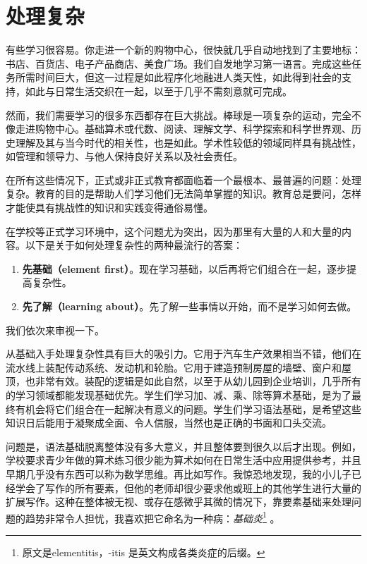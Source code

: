 \section*{处理复杂}

有些学习很容易。你走进一个新的购物中心，很快就几乎自动地找到了主要地标：书店、百货店、电子产品商店、美食广场。我们自发地学习第一语言。完成这些任务所需时间巨大，但这一过程是如此程序化地融进人类天性，如此得到社会的支持，如此与日常生活交织在一起，以至于几乎不需刻意就可完成。

然而，我们需要学习的很多东西都存在巨大挑战。棒球是一项复杂的运动，完全不像走进购物中心。基础算术或代数、阅读、理解文学、科学探索和科学世界观、历史理解及其与当今时代的相关性，也是如此。学术性较低的领域同样具有挑战性，如管理和领导力、与他人保持良好关系以及社会责任。

在所有这些情况下，正式或非正式教育都面临着一个最根本、最普遍的问题：处理复杂。教育的目的是帮助人们学习他们无法简单掌握的知识。教育总是要问，怎样才能使具有挑战性的知识和实践变得通俗易懂。

在学校等正式学习环境中，这个问题尤为突出，因为那里有大量的人和大量的内容。以下是关于如何处理复杂性的两种最流行的答案：

\begin{enumerate}
\item \textbf{先基础（element first）}。现在学习基础，以后再将它们组合在一起，逐步提高复杂性。
\item \textbf{先了解（learning about）}。先了解一些事情以开始，而不是学习如何去做。
\end{enumerate}

我们依次来审视一下。

从基础入手处理复杂性具有巨大的吸引力。它用于汽车生产效果相当不错，他们在流水线上装配传动系统、发动机和轮胎。它用于建造预制房屋的墙壁、窗户和屋顶，也非常有效。装配的逻辑是如此自然，以至于从幼儿园到企业培训，几乎所有的学习领域都能发现基础优先。学生们学习加、减、乘、除等算术基础，是为了最终有机会将它们组合在一起解决有意义的问题。学生们学习语法基础，是希望这些知识日后能用于凝聚成全面、令人信服，当然也是正确的书面和口头交流。

问题是，语法基础脱离整体没有多大意义，并且整体要到很久以后才出现。例如，学校要求青少年做的算术练习很少能为算术如何在日常生活中应用提供参考，并且早期几乎没有东西可以称为数学思维。再比如写作。我惊恐地发现，我的小儿子已经学会了写作的所有要素，但他的老师却很少要求他或班上的其他学生进行大量的扩展写作。这种在整体被无视、或存在感微乎其微的情况下，靠要素基础来处理问题的趋势非常令人担忧，我喜欢把它命名为一种病：\textit{基础炎}\footnote{原文是elementitis，-itis 是英文构成各类炎症的后缀。} 。

